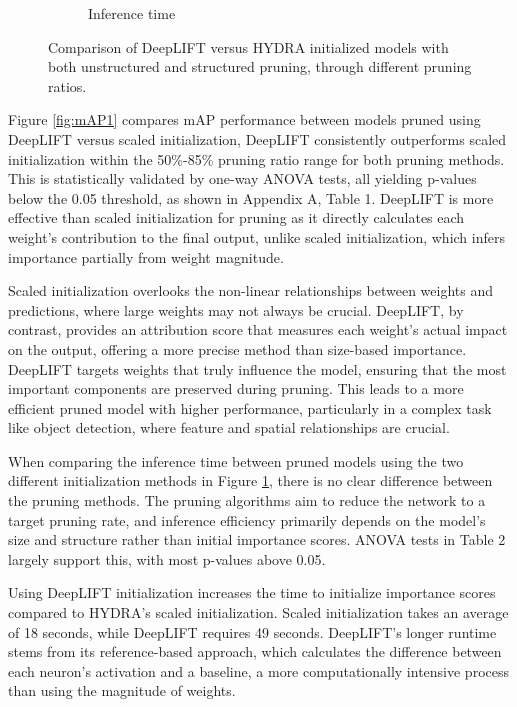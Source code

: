 \documentclass[10pt]{cai}
\begin{document}
\begin{figure}
\begin{subfigure}[b]{.45\textwidth}
      \caption{Inference time}
      \label{fig:time1}
    \end{subfigure}
    \caption{Comparison of DeepLIFT versus HYDRA initialized models with both unstructured and structured pruning, through different pruning ratios.}
    \label{fig:result1}
\end{figure}

Figure \ref{fig:mAP1} compares mAP performance between models pruned using DeepLIFT versus scaled initialization, DeepLIFT consistently outperforms scaled initialization within the 50\%-85\% pruning ratio range for both pruning methods. This is statistically validated by one-way ANOVA tests, all yielding p-values below the 0.05 threshold, as shown in Appendix A, Table 1. DeepLIFT is more effective than scaled initialization for pruning as it directly calculates each weight's contribution to the final output, unlike scaled initialization, which infers importance partially from weight magnitude.

Scaled initialization overlooks the non-linear relationships between weights and predictions, where large weights may not always be crucial. DeepLIFT, by contrast, provides an attribution score that measures each weight's actual impact on the output, offering a more precise method than size-based importance. DeepLIFT targets weights that truly influence the model, ensuring that the most important components are preserved during pruning. This leads to a more efficient pruned model with higher performance, particularly in a complex task like object detection, where feature and spatial relationships are crucial.

When comparing the inference time between pruned models using the two different initialization methods in Figure \ref{fig:time1}, there is no clear difference between the pruning methods. The pruning algorithms aim to reduce the network to a target pruning rate, and inference efficiency primarily depends on the model’s size and structure rather than initial importance scores. ANOVA tests in Table 2 largely support this, with most p-values above 0.05. 

Using DeepLIFT initialization increases the time to initialize importance scores compared to HYDRA's scaled initialization. Scaled initialization takes an average of 18 seconds, while DeepLIFT requires 49 seconds. DeepLIFT's longer runtime stems from its reference-based approach, which calculates the difference between each neuron's activation and a baseline, a more computationally intensive process than using the magnitude of weights.
\end{document}
